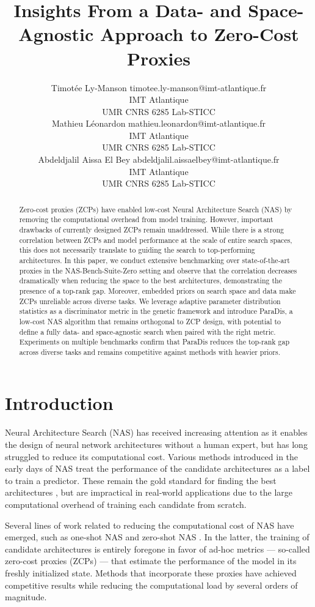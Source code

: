 \documentclass[10pt]{article} %
\title{Insights From a Data- and Space-Agnostic Approach to Zero-Cost Proxies}
\author{\name Timotée Ly-Manson \email timotee.ly-manson@imt-atlantique.fr \\
        \addr IMT Atlantique\\
        UMR CNRS 6285 Lab-STICC\\
      \AND
      \name Mathieu Léonardon \email mathieu.leonardon@imt-atlantique.fr \\
      \addr IMT Atlantique\\
        UMR CNRS 6285 Lab-STICC\\
      \AND
      \name Abdeldjalil Aissa El Bey \email abdeldjalil.aissaelbey@imt-atlantique.fr\\
      \addr IMT Atlantique\\
        UMR CNRS 6285 Lab-STICC\\
}
\begin{document}
\maketitle

\begin{abstract}
Zero-cost proxies (ZCPs) have enabled low-cost Neural Architecture Search (NAS) by removing the computational overhead from model training. However, important drawbacks of currently designed ZCPs remain unaddressed. While there is a strong correlation between ZCPs and model performance at the scale of entire search spaces, this does not necessarily translate to guiding the search to top-performing architectures. In this paper, we conduct extensive benchmarking over state-of-the-art proxies in the NAS-Bench-Suite-Zero setting and observe that the correlation decreases dramatically when reducing the space to the best architectures, demonstrating the presence of a top-rank gap. Moreover, embedded priors on search space and data make ZCPs unreliable across diverse tasks. We leverage adaptive parameter distribution statistics as a discriminator metric in the genetic framework and introduce ParaDis, a low-cost NAS algorithm that remains orthogonal to ZCP design, with potential to define a fully data- and space-agnostic search when paired with the right metric. Experiments on multiple benchmarks confirm that ParaDis reduces the top-rank gap across diverse tasks and remains competitive against methods with heavier priors.
\end{abstract}

\section{Introduction}
\label{intro}

Neural Architecture Search (NAS) has received increasing attention as it enables the design of neural network architectures without a human expert, but has long struggled to reduce its computational cost. Various methods introduced in the early days of NAS \citep{zoph2017neural, liu2018progressive} treat the performance of the candidate architectures as a label to train a predictor. These remain the gold standard for finding the best architectures \citep{white2021bananas, schrodi2023construction}, but are impractical in real-world applications due to the large computational overhead of training each candidate from scratch.

Several lines of work related to reducing the computational cost of NAS have emerged, such as one-shot NAS \citep{pham2018efficient, guo2020single, chu2021fairnas, liu2018darts} and zero-shot NAS \citep{mellor2021neural, abdelfattah2021zero}. In the latter, the training of candidate architectures is entirely foregone in favor of ad-hoc metrics --- so-called zero-cost proxies (ZCPs) --- that estimate the performance of the model in its freshly initialized state. Methods that incorporate these proxies have achieved competitive results \citep{jiang2023meco, peng2024swap} while reducing the computational load by several orders of magnitude.
\end{document}
